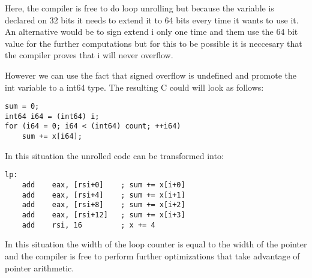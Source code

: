 Here, the compiler is free to do loop unrolling but because the variable
is declared on 32 bits it needs to extend it to 64 bits every time it
wants to use it. An alternative would be to sign extend i only one time
and them use the 64 bit value for the further computations but for this
to be possible it is neccesary that the compiler proves that i will
never overflow.

However we can use the fact that signed overflow is undefined and
promote the int variable to a int64 type. The resulting C could will
look as follows:
\begin{lstlisting}[style=Cstyle, caption={}, label={}]
sum = 0;
int64 i64 = (int64) i;
for (i64 = 0; i64 < (int64) count; ++i64)
	sum += x[i64];
\end{lstlisting}

In this situation the unrolled code can be transformed into:
\begin{lstlisting}[style=Cstyle, caption={}, label={}]
  lp:
    add    eax, [rsi+0]    ; sum += x[i+0]
    add    eax, [rsi+4]    ; sum += x[i+1]
    add    eax, [rsi+8]    ; sum += x[i+2]
    add    eax, [rsi+12]   ; sum += x[i+3]
    add    rsi, 16         ; x += 4
\end{lstlisting}

In this situation the width of the loop counter is equal to the width of
the pointer and the compiler is free to perform further optimizations
that take advantage of pointer arithmetic.
